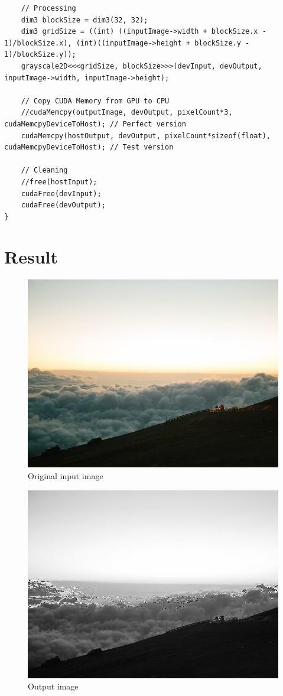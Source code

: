 \documentclass{article}
\begin{document}
\begin{lstlisting}
    // Processing
    dim3 blockSize = dim3(32, 32);
    dim3 gridSize = ((int) ((inputImage->width + blockSize.x - 1)/blockSize.x), (int)((inputImage->height + blockSize.y - 1)/blockSize.y));
    grayscale2D<<<gridSize, blockSize>>>(devInput, devOutput, inputImage->width, inputImage->height);

    // Copy CUDA Memory from GPU to CPU
    //cudaMemcpy(outputImage, devOutput, pixelCount*3, cudaMemcpyDeviceToHost); // Perfect version 
    cudaMemcpy(hostOutput, devOutput, pixelCount*sizeof(float), cudaMemcpyDeviceToHost); // Test version

    // Cleaning
    //free(hostInput);
    cudaFree(devInput);
    cudaFree(devOutput);
}

\end{lstlisting}
\section*{Result}
\begin{figure}[h]
\center\includegraphics[scale=0.3]{./labwork/data/cloud.jpeg}
\caption{Original input image}
\end{figure}
\begin{figure}[h]
\center\includegraphics[scale=0.3]{./labwork/build/labwork4-gpu-out.jpg}
\caption{Output image}
\end{figure}
\newpage
\end{document}
